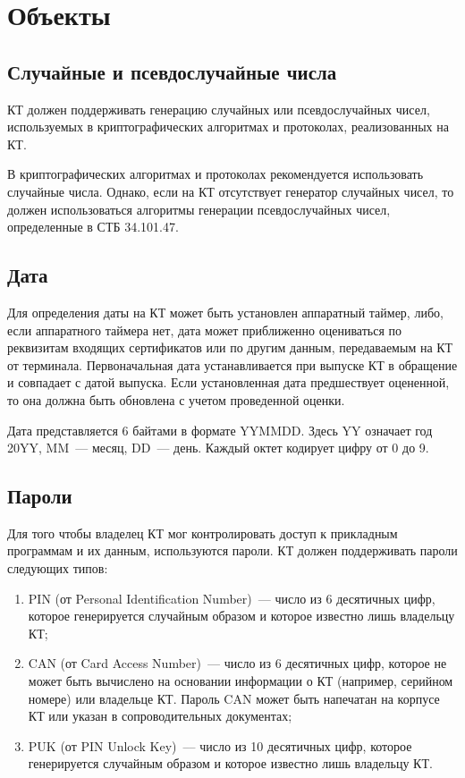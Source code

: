 \chapter{Объекты}\label{OBJ}

\section{Случайные и псевдослучайные числа}\label{OBJ.RNG}

КТ должен поддерживать генерацию случайных или псевдослучайных чисел, 
используемых в криптографических алгоритмах и протоколах, реализованных на 
КТ. 

В криптографических алгоритмах и протоколах рекомендуется использовать 
случайные числа. Однако, если на КТ отсутствует генератор случайных чисел, 
то должен использоваться алгоритмы генерации псевдослучайных чисел, 
определенные в СТБ 34.101.47.

\section{Дата}\label{OBJ.Date}

Для определения даты на КТ может быть установлен аппаратный таймер, либо, 
если аппаратного таймера нет, дата может приближенно оцениваться по 
реквизитам входящих сертификатов или по другим данным, передаваемым на КТ 
от терминала. Первоначальная дата устанавливается при выпуске КТ в обращение и 
совпадает с датой выпуска. Если установленная дата предшествует оцененной, 
то она должна быть обновлена с учетом проведенной оценки. 

Дата представляется 6 байтами в формате YYMMDD. Здесь YY означает год 
20YY, MM~--- месяц, DD~--- день. Каждый октет кодирует цифру от 0 до 9. 

\section{Пароли}\label{OBJ.PWD}

Для того чтобы владелец КТ мог контролировать доступ к прикладным 
программам и их данным, используются пароли. КТ должен поддерживать пароли 
следующих типов: 

\begin{enumerate}
\item 
PIN (от Personal Identification Number)~--- 
число из 6 десятичных цифр, которое генерируется случайным образом и 
которое известно лишь владельцу КТ; 

\item 
CAN (от Card Access Number)~--- число из 6 десятичных цифр, 
которое не может быть вычислено на основании информации о КТ 
(например, серийном номере) или владельце КТ. Пароль CAN может быть 
напечатан на корпусе КТ или указан в сопроводительных документах; 

\item 
PUK (от PIN Unlock Key)~--– число из 10 десятичных цифр, 
которое генерируется случайным образом и которое известно лишь 
владельцу КТ. 
\end{enumerate}

